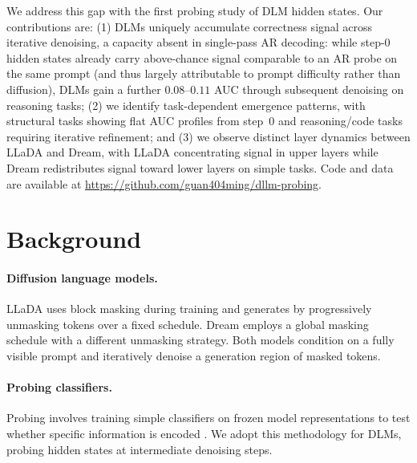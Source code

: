 \documentclass[11pt]{article}
\begin{document}
We address this gap with the first probing study of DLM hidden states.
Our contributions are: (1) DLMs uniquely accumulate correctness signal across iterative denoising, a capacity absent in single-pass AR decoding: while step-0 hidden states already carry above-chance signal comparable to an AR probe on the same prompt (and thus largely attributable to prompt difficulty rather than diffusion), DLMs gain a further $0.08$--$0.11$ AUC through subsequent denoising on reasoning tasks; (2) we identify task-dependent emergence patterns, with structural tasks showing flat AUC profiles from step~0 and reasoning/code tasks requiring iterative refinement; and (3) we observe distinct layer dynamics between LLaDA and Dream, with LLaDA concentrating signal in upper layers while Dream redistributes signal toward lower layers on simple tasks.
Code and data are available at \url{https://github.com/guan404ming/dllm-probing}.

\section{Background}

\paragraph{Diffusion language models.}
LLaDA \citep{nie2025llada} uses block masking during training and generates by progressively unmasking tokens over a fixed schedule.
Dream \citep{ye2025dream} employs a global masking schedule with a different unmasking strategy.
Both models condition on a fully visible prompt and iteratively denoise a generation region of masked tokens.

\paragraph{Probing classifiers.}
Probing involves training simple classifiers on frozen model representations to test whether specific information is encoded \citep{belinkov2022probing,conneau2018cram}.
We adopt this methodology for DLMs, probing hidden states at intermediate denoising steps.
\end{document}
